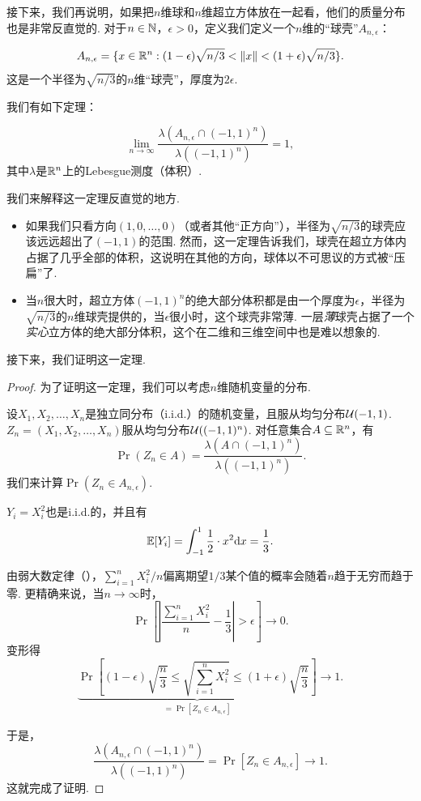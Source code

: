 接下来，我们再说明，如果把$n$维球和$n$维超立方体放在一起看，他们的质量分布也是非常反直觉的. 对于$n \in \mathbb{N}$，$\epsilon>0$，定义我们定义一个$n$维的“球壳”$A_{n,\epsilon}$：

\[A_{n,\epsilon} = \{x \in \mathbb{R}^n:(1-\epsilon)\sqrt{n/3}<\left\|x\right\|<(1+\epsilon)\sqrt{n/3}\}.\]
这是一个半径为$\sqrt{n/3}$的$n$维“球壳”，厚度为$2\epsilon$. 

我们有如下定理：
\begin{theorem}
\[\lim_{n\to \infty} \frac{\lambda (A_{n,\epsilon}\cap (-1,1)^n)}{\lambda((-1,1)^n)} = 1,\]
其中$\lambda$是$\mathbb{R}^n$上的Lebesgue测度（体积）. 
\end{theorem}

我们来解释这一定理反直觉的地方. 
\begin{itemize}
    \item 如果我们只看方向$(1,0,\dots,0)$（或者其他“正方向”），半径为$\sqrt{n/3}$的球壳应该远远超出了$(-1,1)$的范围. 然而，这一定理告诉我们，球壳在超立方体内占据了几乎全部的体积，这说明在其他的方向，球体以不可思议的方式被“压扁”了. 
    \item 当$n$很大时，超立方体$(-1,1)^n$的绝大部分体积都是由一个厚度为$\epsilon$，半径为$\sqrt{n/3}$的$n$维球壳提供的，当$\epsilon$很小时，这个球壳非常薄. 一层\emph{薄}球壳占据了一个\emph{实心}立方体的绝大部分体积，这个在二维和三维空间中也是难以想象的. 
\end{itemize}

接下来，我们证明这一定理. 
\begin{proof}

为了证明这一定理，我们可以考虑$n$维随机变量的分布. 

设$X_1, X_2, \dots, X_n$是独立同分布（i.i.d.）的随机变量，且服从均匀分布$\mathcal{U}(-1,1)$. $Z_n=(X_1,X_2,\dots,X_n)$服从均匀分布$\mathcal{U}((-1,1)^n)$. 对任意集合$A\subseteq \mathbb{R}^n$，有
\[\Pr(Z_n\in A) = \frac{\lambda(A\cap (-1,1)^n)}{\lambda((-1,1)^n)}.\]
我们来计算$\Pr(Z_n\in A_{n,\epsilon})$. 

$Y_i=X_i^2$也是i.i.d.的，并且有\[\mathbb{E}[Y_i] = \int_{-1}^1 \frac{1}{2}\cdot x^2 \mathrm{d} x = \frac{1}{3}.\]

由弱大数定律（），$\sum_{i=1}^n X_i^2/n$偏离期望$1/3$某个值的概率会随着$n$趋于无穷而趋于零. 更精确来说，当$n\to \infty$时，
\[
\Pr\left[\left|\frac{\sum_{i=1}^n X_i^2}{n}-\frac{1}{3}\right|>\epsilon\right]\to 0.
\]
变形得
\[
\underbrace{\Pr\left[(1-\epsilon)\sqrt{\frac{n}{3}}\leq \sqrt{\sum_{i=1}^nX_i^2}\leq (1+\epsilon)\sqrt{\frac{n}{3}}\right]}_{=\Pr\left[Z_n \in A_{n,\epsilon}\right]}\to 1.
\]

于是，
\[
\frac{\lambda (A_{n,\epsilon}\cap (-1,1)^n)}{\lambda((-1,1)^n)}=\Pr\left[Z_n \in A_{n,\epsilon}\right]\to 1.
\]
这就完成了证明. 
\end{proof}

